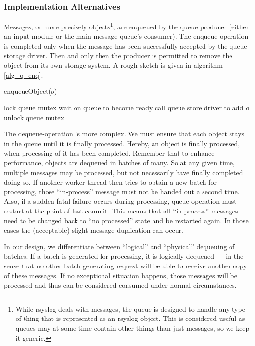 \documentclass[a4paper,10pt]{article}
\begin{document}
\subsubsection{Implementation Alternatives}
Messages, or more precisely objects\footnote{While rsyslog deals with messages, the queue is designed to handle any type of thing that is represented as an rsyslog object. This is considered useful as queues may at some time contain other things than just messages, so we keep it generic.}, are enqueued by the queue producer (either an input module or the main message queue's consumer). The enqueue operation is completed only when the message has been successfully accepted by the queue storage driver. Then and only then the producer is permitted to remove the object from its own storage system. A rough sketch is given in algorithm \ref{alg_q_enq}.

\begin{algorithm}
\caption{enqueueObject($o$)}
\begin{algorithmic}
\label{alg_q_enq}
\STATE lock queue mutex
	\STATE wait on queue to become ready
\ENDWHILE
\STATE call queue store driver to add $o$
\STATE unlock queue mutex
\end{algorithmic}
\end{algorithm}

The dequeue-operation is more complex. We must ensure that each object stays in the queue until it is finally processed. Hereby, an object is finally processed, when processing of it has been completed. Remember that to enhance performance, objects are dequeued in batches of many. So at any given time, multiple messages may be processed, but not necessarily have finally completed doing so. If another worker thread then tries to obtain a new batch for processing, those ``in-process'' message must not be handed out a second time. Also, if a sudden fatal failure occurs during processing, queue operation must restart at the point of last commit. This means that all ``in-process'' messages need to be changed back to ``no processed'' state and be restarted again. In those cases the (acceptable) slight message duplication can occur.

In our design, we differentiate between ``logical'' and ``physical'' dequeuing of batches. If a batch is generated for processing, it is logically dequeued --- in the sense that no other batch generating request will be able to receive another copy of these messages. If no exceptional situation happens, those messages will be processed and thus can be considered consumed under normal circumstances.
\end{document}
